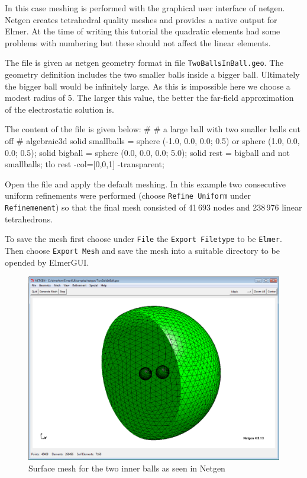 In this case meshing is performed with the graphical user interface of netgen. Netgen creates tetrahedral quality meshes
and provides a native output for Elmer.
At the time of writing this tutorial the quadratic elements had some problems with numbering 
but these should not affect the linear elements.

The file is given as netgen geometry format in file \texttt{TwoBallsInBall.geo}. The geometry definition includes the 
two smaller balls inside a bigger ball. Ultimately the bigger ball would be infinitely large. As this is impossible 
here we choose a modest radius of 5. The larger this value, the better the far-field approximation of the 
electrostatic solution is.

The content of the file is given below:
\ttbegin
#
# a large ball with two smaller balls cut off
#
algebraic3d
solid smallballs = sphere (-1.0, 0.0, 0.0; 0.5)
           or sphere (1.0, 0.0, 0.0; 0.5);
solid bigball = sphere (0.0, 0.0, 0.0; 5.0);
solid rest = bigball and not smallballs;
tlo rest -col=[0,0,1] -transparent;
\ttend

Open the file and apply the default meshing. In this example two consecutive uniform refinements were performed 
(choose \texttt{Refine Uniform} under \texttt{Refinemenent}) so that the 
final mesh consisted of 41\,693 nodes and 238\,976 linear tetrahedrons. 

To save the mesh first choose under \texttt{File} the \texttt{Export Filetype} to be \texttt{Elmer}. Then choose
\texttt{Export Mesh} and save the mesh into a suitable directory to be opended
by ElmerGUI. 

\begin{figure}[h]
\centering
\includegraphics[width=140mm]{netgen_capture}
\caption{Surface mesh for the two inner balls as seen in Netgen}\label{fg:ballsnetgen}
\end{figure}  

